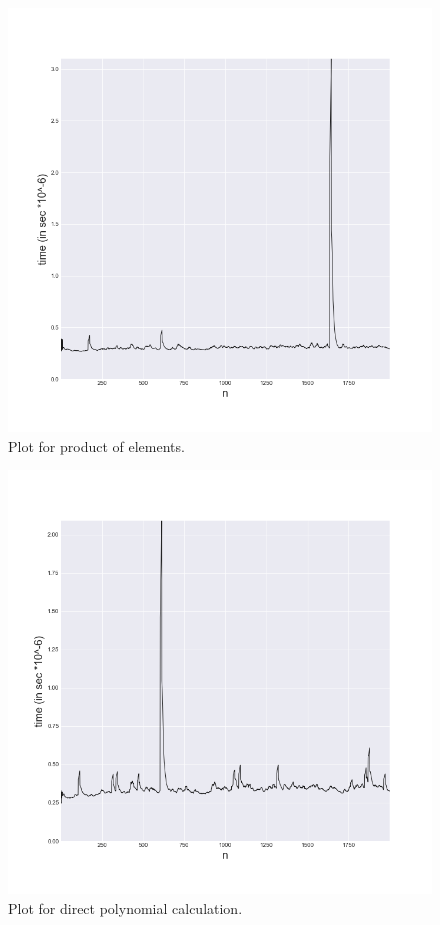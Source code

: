 \documentclass[a4paper,article,14pt]{extarticle}
\begin{document}
	\begin{figure}[h]
		\centering
		\includegraphics[scale=0.5]{productOfVector.png}
		\caption{Plot for product of elements.}
		\label{product}
	\end{figure} 
	\begin{figure}[h]
		\centering
		\includegraphics[scale=0.5]{calculatePolinom.png}
		\caption{Plot for direct polynomial calculation.}
		\label{direct}
	\end{figure} 
\end{document}
